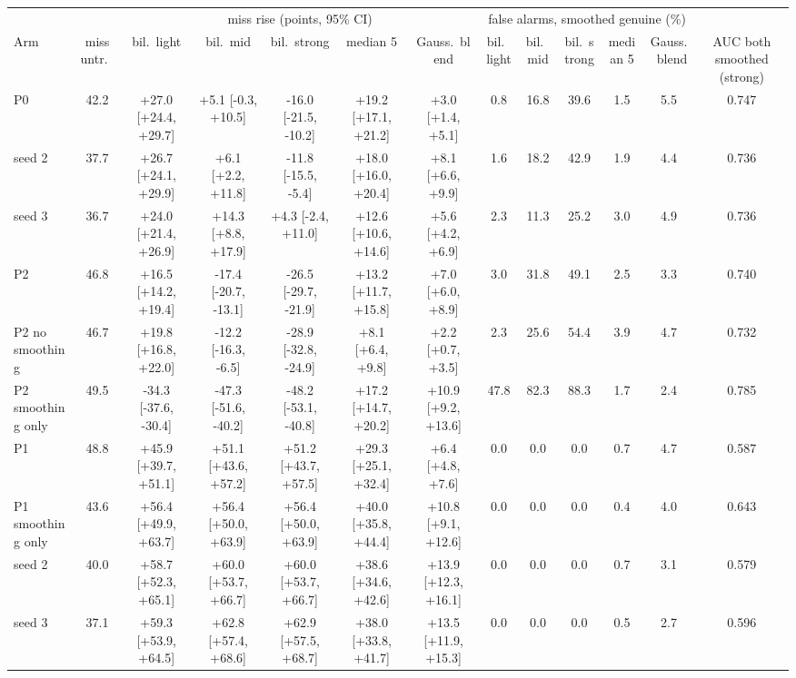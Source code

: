 \begin{tabular}{@{}l c ccccc ccccc c@{}}
\toprule
 & & \multicolumn{5}{c}{miss rise (points, 95\% CI)} & \multicolumn{5}{c}{false alarms, smoothed genuine (\%)} & \\
\cmidrule(lr){3-7}\cmidrule(lr){8-12}
Arm & miss untr.\ & bil.\ light & bil.\ mid & bil.\ strong & median 5 & Gauss.\ blend & bil.\ light & bil.\ mid & bil.\ strong & median 5 & Gauss.\ blend & AUC both smoothed (strong) \\
\midrule
P0 & 42.2 & +27.0 [+24.4, +29.7] & +5.1 [-0.3, +10.5] & -16.0 [-21.5, -10.2] & +19.2 [+17.1, +21.2] & +3.0 [+1.4, +5.1] & 0.8 & 16.8 & 39.6 & 1.5 & 5.5 & 0.747 \\
\quad seed 2 & 37.7 & +26.7 [+24.1, +29.9] & +6.1 [+2.2, +11.8] & -11.8 [-15.5, -5.4] & +18.0 [+16.0, +20.4] & +8.1 [+6.6, +9.9] & 1.6 & 18.2 & 42.9 & 1.9 & 4.4 & 0.736 \\
\quad seed 3 & 36.7 & +24.0 [+21.4, +26.9] & +14.3 [+8.8, +17.9] & +4.3 [-2.4, +11.0] & +12.6 [+10.6, +14.6] & +5.6 [+4.2, +6.9] & 2.3 & 11.3 & 25.2 & 3.0 & 4.9 & 0.736 \\
P2 & 46.8 & +16.5 [+14.2, +19.4] & -17.4 [-20.7, -13.1] & -26.5 [-29.7, -21.9] & +13.2 [+11.7, +15.8] & +7.0 [+6.0, +8.9] & 3.0 & 31.8 & 49.1 & 2.5 & 3.3 & 0.740 \\
P2 no smoothing & 46.7 & +19.8 [+16.8, +22.0] & -12.2 [-16.3, -6.5] & -28.9 [-32.8, -24.9] & +8.1 [+6.4, +9.8] & +2.2 [+0.7, +3.5] & 2.3 & 25.6 & 54.4 & 3.9 & 4.7 & 0.732 \\
P2 smoothing only & 49.5 & -34.3 [-37.6, -30.4] & -47.3 [-51.6, -40.2] & -48.2 [-53.1, -40.8] & +17.2 [+14.7, +20.2] & +10.9 [+9.2, +13.6] & 47.8 & 82.3 & 88.3 & 1.7 & 2.4 & 0.785 \\
P1 & 48.8 & +45.9 [+39.7, +51.1] & +51.1 [+43.6, +57.2] & +51.2 [+43.7, +57.5] & +29.3 [+25.1, +32.4] & +6.4 [+4.8, +7.6] & 0.0 & 0.0 & 0.0 & 0.7 & 4.7 & 0.587 \\
P1 smoothing only & 43.6 & +56.4 [+49.9, +63.7] & +56.4 [+50.0, +63.9] & +56.4 [+50.0, +63.9] & +40.0 [+35.8, +44.4] & +10.8 [+9.1, +12.6] & 0.0 & 0.0 & 0.0 & 0.4 & 4.0 & 0.643 \\
\quad seed 2 & 40.0 & +58.7 [+52.3, +65.1] & +60.0 [+53.7, +66.7] & +60.0 [+53.7, +66.7] & +38.6 [+34.6, +42.6] & +13.9 [+12.3, +16.1] & 0.0 & 0.0 & 0.0 & 0.7 & 3.1 & 0.579 \\
\quad seed 3 & 37.1 & +59.3 [+53.9, +64.5] & +62.8 [+57.4, +68.6] & +62.9 [+57.5, +68.7] & +38.0 [+33.8, +41.7] & +13.5 [+11.9, +15.3] & 0.0 & 0.0 & 0.0 & 0.5 & 2.7 & 0.596 \\

\end{tabular}
